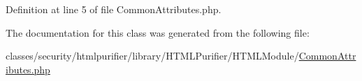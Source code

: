 Definition at line 5 of file Common\+Attributes.\+php.



The documentation for this class was generated from the following file\+:\begin{DoxyCompactItemize}
\item 
classes/security/htmlpurifier/library/\+H\+T\+M\+L\+Purifier/\+H\+T\+M\+L\+Module/\hyperlink{CommonAttributes_8php}{Common\+Attributes.\+php}\end{DoxyCompactItemize}

